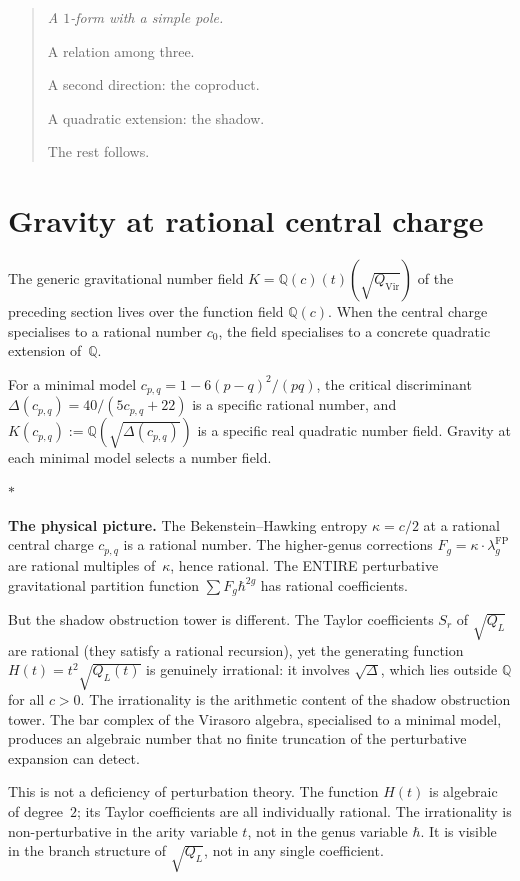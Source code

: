 \documentclass[11pt]{article}
\newcommand{\Q}{\mathbb{Q}}
\newcommand{\sep}{\bigskip\begin{center}$*$\end{center}\medskip}
\begin{document}
\begin{quote}\itshape
A $1$-form with a simple pole.

A relation among three.

A second direction: the coproduct.

A quadratic extension: the shadow.

The rest follows.
\end{quote}


\section{Gravity at rational central charge}
\label{sec:gravity-rational-c}

The generic gravitational number field
$K = \Q(c)(t)(\sqrt{Q_{\mathrm{Vir}}})$ of the preceding
section lives over the function field $\Q(c)$.  When the
central charge specialises to a rational number $c_0$, the
field specialises to a concrete quadratic extension of~$\Q$.

For a minimal model $c_{p,q} = 1 - 6(p-q)^2/(pq)$,
the critical discriminant
$\Delta(c_{p,q}) = 40/(5c_{p,q} + 22)$ is a specific
rational number, and
$K(c_{p,q}) := \Q(\sqrt{\Delta(c_{p,q})})$
is a specific real quadratic number field.  Gravity at
each minimal model selects a number field.

\sep

\noindent\textbf{The physical picture.}\enspace
The Bekenstein--Hawking entropy $\kappa = c/2$ at a rational
central charge $c_{p,q}$ is a rational number.  The
higher-genus corrections $F_g = \kappa \cdot \lambda_g^{\mathrm{FP}}$
are rational multiples of~$\kappa$, hence rational.  The
ENTIRE perturbative gravitational partition function
$\sum F_g \hbar^{2g}$ has rational coefficients.

But the shadow obstruction tower is different.  The Taylor coefficients
$S_r$ of $\sqrt{Q_L}$ are rational (they satisfy a rational
recursion), yet the generating function $H(t) = t^2\sqrt{Q_L(t)}$
is genuinely irrational: it involves $\sqrt{\Delta}$, which
lies outside $\Q$ for all $c > 0$.  The irrationality is the
arithmetic content of the shadow obstruction tower.  The bar complex of
the Virasoro algebra, specialised to a minimal model, produces
an algebraic number that no finite truncation of the
perturbative expansion can detect.

This is not a deficiency of perturbation theory.  The function
$H(t)$ is algebraic of degree~$2$; its Taylor coefficients are
all individually rational.  The irrationality is non-perturbative
in the arity variable $t$, not in the genus variable $\hbar$.
It is visible in the branch structure of $\sqrt{Q_L}$, not in
any single coefficient.
\end{document}

